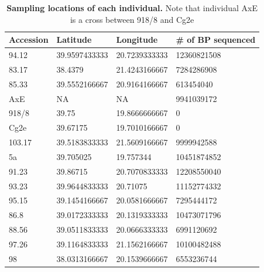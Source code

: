 \begin{table}[ht!]
\centering
\begin{tabular}{|l |l l l|} 
 \hline
 Accession & Latitude & Longitude & \# of BP sequenced \\ [0.5ex] 
 \hline
94.12	& 39.9597433333	& 20.7239333333	& 12360821508 \\
83.17	& 38.4379	& 21.4243166667	& 7284286908 \\
85.33	& 39.5552166667	& 20.9164166667	& 613454040 \\
AxE	& NA	& NA	& 9941039172 \\
918/8	& 39.75	& 19.8666666667	& 0 \\
Cg2e	& 39.67175	& 19.7010166667	& 0 \\
103.17	& 39.5183833333	& 21.5609166667	& 9999942588 \\
5a	& 39.705025	& 19.757344	& 10451874852 \\
91.23	& 39.86715	& 20.7070833333	& 12208550040 \\
93.23	& 39.9644833333	& 20.71075	& 11152774332 \\
95.15	& 39.1454166667	& 20.0581666667	& 7295444172 \\
86.8	& 39.0172333333	& 20.1319333333	& 10473071796 \\
88.56	& 39.0511833333	& 20.0666333333	& 6991120692 \\
97.26	& 39.1164833333	& 21.1562166667	& 10100482488 \\
98	& 38.0313166667	& 20.1539666667	& 6553236744 \\ [1ex] 
 \hline
\end{tabular}
\caption{\textbf{Sampling locations of each individual.} Note that individual AxE is a cross between 918/8 and Cg2e}
\label{table:s1}
\end{table}


